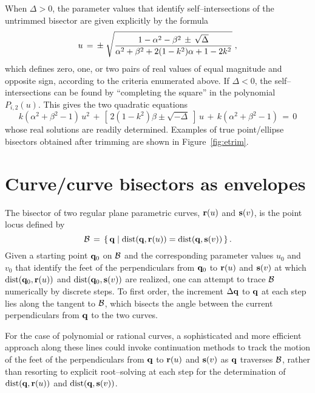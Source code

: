 When $\Delta>0$, the parameter values that identify self--intersections
of the untrimmed bisector are given explicitly by the formula
\begin{equation}
u \,=\, \pm \; \sqrt{ 1-\alpha^2-\beta^2 \,\pm\,
\sqrt{\Delta} \over \alpha^2+\beta^2+2(1-k^2)\alpha+1-2k^2} \;,
\end{equation}
which defines zero, one, or two pairs of real values of equal
magnitude and opposite sign, according to the criteria enumerated
above. If $\Delta<0$, the self--intersections can be found by
``completing the square'' in the polynomial $P_{i,2}(u)$. This
gives the two quadratic equations
\begin{equation} \label{I2new2}
k(\alpha^2+\beta^2-1)\,u^2 \,+\,
[\,2(1-k^2)\beta \pm \sqrt{-\Delta}\;]\,u \,+\,
k(\alpha^2+\beta^2-1) \,=\, 0
\end{equation}
whose real solutions are readily determined. Examples of true
point/ellipse bisectors obtained after trimming are shown in
Figure~\ref{fig:etrim}.

\section{Curve/curve bisectors as envelopes}

The bisector of two regular plane parametric curves, ${\bf r}(u)$
and ${\bf s}(v)$, is the point locus defined by
\begin{equation}
{\cal B} \,=\, \{\, {\bf q} \;|\;
{\rm dist}({\bf q},{\bf r}(u))={\rm dist}({\bf q},{\bf s}(v)) \,\} \,.
\end{equation}
Given a starting point ${\bf q}_0$ on ${\cal B}$ and the
corresponding parameter values $u_0$ and $v_0$ that identify the
feet of the perpendiculars from ${\bf q}_0$ to ${\bf r}(u)$ and
${\bf s}(v)$ at which ${\rm dist}({\bf q}_0,{\bf r}(u))$ and
${\rm dist}({\bf q}_0,{\bf s}(v))$ are realized, one can attempt
to trace ${\cal B}$ numerically by discrete steps. To first order,
the increment $\Delta {\bf q}$ to ${\bf q}$ at each step lies
along the tangent to ${\cal B}$, which bisects the angle between
the current perpendiculars from ${\bf q}$ to the two curves.

For the case of polynomial or rational curves, a sophisticated and
more efficient approach along these lines could invoke continuation
methods \cite{morgan87} to track the motion of the feet of the
perpendiculars from ${\bf q}$ to ${\bf r}(u)$ and ${\bf s}(v)$ as
${\bf q}$ traverses ${\cal B}$, rather than resorting to explicit
root--solving at each step for the determination of ${\rm dist}
({\bf q},{\bf r}(u))$ and ${\rm dist}({\bf q},{\bf s}(v))$.

